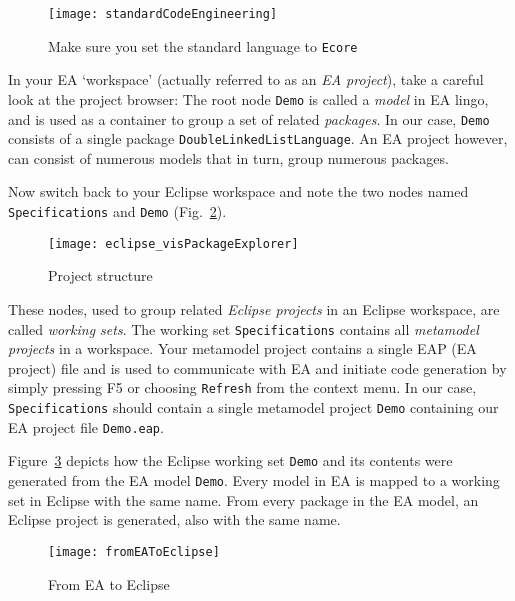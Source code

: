 
\begin{figure}[htbp]
    \centering
    \texttt{[image: standardCodeEngineering]}
    \caption{Make sure you set the standard language to \texttt{Ecore}}
    \label{fig_standardSCEEA}
 \end{figure}
 
\clearpage

In your EA `workspace' (actually referred to as an \emph{EA project}), take a careful  look at the project browser:  The root node \texttt{Demo} is called a
\emph{model} in EA lingo, and is used as a container to group a set of related \emph{packages}. In our case, \texttt{Demo}  consists of a single package
\texttt{DoubleLinkedListLanguage}. An EA project however, can consist of numerous models that in turn, group numerous packages.

Now switch back to your Eclipse workspace and note the two nodes named \texttt{Spe\-ci\-fi\-ca\-tions} and \texttt{Demo} (Fig.~\ref{fig_eclipsePS}).

\begin{figure}[htbp]
    \centering
    \texttt{[image: eclipse\_visPackageExplorer]}
    \caption{Project structure}
    \label{fig_eclipsePS}
 \end{figure}


These nodes, used to group related \emph{Eclipse projects} in an Eclipse workspace, are called \emph{working sets}. The working set
\texttt{Spe\-ci\-fi\-ca\-tions} contains all \emph{metamodel projects} in a  workspace. Your metamodel project contains a single EAP (EA project) file and is
used to communicate with EA and initiate code generation by simply pressing F5 or choosing \texttt{Refresh} from the context menu.
In our case, \texttt{Specifications} should contain a single metamodel project \texttt{Demo} containing our EA project file  \texttt{Demo.eap}.
 
Figure~\ref{fig_fromEAtoEclipse} depicts how the Eclipse working set \texttt{Demo} and its contents were generated from the EA model \texttt{Demo}. Every model
in EA is mapped to a working set in Eclipse with the same name. From every package in the EA model, an Eclipse project is generated, also with the same name.

\begin{figure}[htbp]
    \centering
  \texttt{[image: fromEAToEclipse]}
    \caption{From EA to Eclipse}
    \label{fig_fromEAtoEclipse}
\end{figure}

